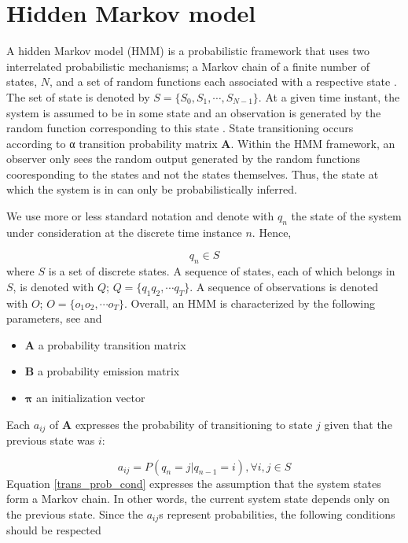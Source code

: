 \section{Hidden Markov model}
\label{hmm_general}

A hidden Markov model (HMM) is a probabilistic framework that uses two interrelated probabilistic mechanisms; a Markov chain of a finite
number of states, $N$, and a set of random functions each associated with a respective state \cite{koski}.  The set of state is denoted by $S=\{S_0, S_1,\cdots, S_{N-1}\}$. At a given time instant, the 
system is assumed to be in some state and an observation is generated by the random function corresponding to this state  \cite{koski}.
State transitioning occurs according to α transition probability matrix  $\mathbf{A}$. Within  the HMM framework, an observer only sees the random output generated by the random functions cooresponding to the states and not the states themselves. Thus, the state at which the system is in can only be probabilistically inferred. 

We use more or less standard notation and denote with $q_n$ the state of the system under consideration at the discrete time instance $n$. Hence,

\begin{equation}
q_n \in S
\end{equation}
where $S$ is a set of discrete states. A sequence of states, each of which belongs in $S$, is denoted with $Q$; $Q=\{q_1q_2,\cdots q_T\}$. A sequence of observations is denoted with $O$; $O=\{o_1o_2,\cdots o_T\}$.
Overall, an HMM is characterized by the following parameters, see \cite{rabiner2009} and \cite{koski}

\begin{itemize}
	\item $\mathbf{A}$ a probability transition matrix
	\item $\mathbf{B}$ a probability emission matrix
	\item $\boldsymbol{\pi}$ an initialization vector
\end{itemize}
Each $a_{ij}$ of $\mathbf{A}$  expresses the probability of transitioning to state $j$ given that the previous state was $i$:

\begin{equation}
a_{ij} = P(q_n = j | q_{n-1} = i), \forall i,j \in S
\label{trans_prob_cond}
\end{equation}
Equation \ref{trans_prob_cond} expresses the assumption that the system states form a Markov chain. In other words, the current system state depends only on the previous state.
Since the $a_{ij}$s represent probabilities, the following conditions should be respected \cite{koski}

